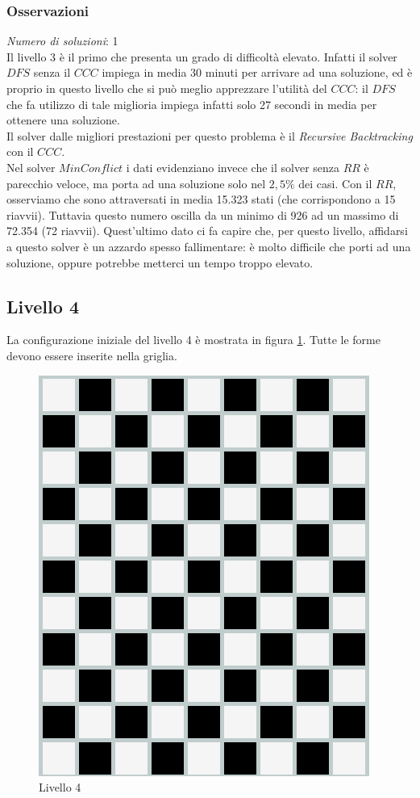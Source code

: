 \subsubsection{Osservazioni}

\textit{Numero di soluzioni}: 1\\

Il livello 3 è il primo che presenta un grado di difficoltà elevato. Infatti il solver $DFS$ senza il $CCC$ impiega in media 30 minuti per arrivare ad una soluzione, ed è proprio in questo livello che si può meglio apprezzare l'utilità del $CCC$: il $DFS$ che fa utilizzo di tale miglioria impiega infatti solo 27 secondi in media per ottenere una soluzione.\\
Il solver dalle migliori prestazioni per questo problema è il \textit{Recursive Backtracking} con il $CCC$.\\

Nel solver $MinConflict$ i dati evidenziano invece che il solver senza $RR$ è parecchio veloce, ma porta ad una soluzione solo nel $2,5\%$ dei casi.
Con il $RR$, osserviamo che sono attraversati in media 15.323 stati (che corrispondono a 15 riavvii). Tuttavia questo numero oscilla da un minimo di 926 ad un massimo di 72.354 (72 riavvii).
Quest'ultimo dato ci fa capire che, per questo livello, affidarsi a questo solver è un azzardo spesso fallimentare: è molto difficile che porti ad una soluzione, oppure potrebbe metterci un tempo troppo elevato. 
\subsection{Livello 4}
La configurazione iniziale del livello 4 è mostrata in figura \ref{lev4}. Tutte le forme devono essere inserite nella griglia.
\begin{figure}[h]
	\centering
	\includegraphics[scale=0.3]{immagini/lv4}
	\caption{Livello 4}
	\label{lev4}
\end{figure}
\\
\noindent

